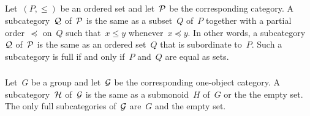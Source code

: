 \subsection{}





\subsubsection{}

Let~$(P, \leq)$ be an ordered set and let~$\mathcal{P}$ be the corresponding category.
A subcategory~$\mathcal{Q}$ of~$\mathcal{P}$ is the same as a subset~$Q$ of~$P$ together with a partial order~$\preceq$ on~$Q$ such that~$x \leq y$ whenever~$x \preceq y$.
In other words, a subcategory~$\mathcal{Q}$ of~$\mathcal{P}$ is the same as an ordered set~$Q$ that is subordinate to~$P$.
Such a subcategory is full if and only if~$P$ and~$Q$ are equal as sets.





\subsubsection{}

Let~$G$ be a group and let~$\mathcal{G}$ be the corresponding one-object category.
A subcategory~$\mathcal{H}$ of~$\mathcal{G}$ is the same as a submonoid~$H$ of~$G$ or the the empty set.
The only full subcategories of~$\mathcal{G}$ are~$G$ and the empty set.

